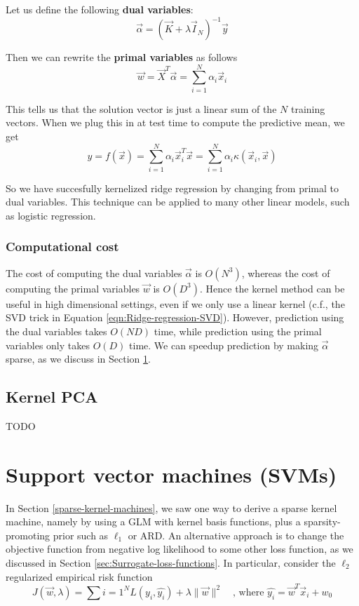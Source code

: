 Let us define the following \textbf{dual variables}:
\begin{equation}
\vec{\alpha}=(\vec{K}+\lambda\vec{I}_N)^{-1}\vec{y}
\end{equation}

Then we can rewrite the \textbf{primal variables} as follows
\begin{equation}
\vec{w}=\vec{X}^T\vec{\alpha}=\sum\limits_{i=1}^N \alpha_i\vec{x}_i
\end{equation}

This tells us that the solution vector is just a linear sum of the $N$ training vectors. When we plug this in at test time to compute the predictive mean, we get
\begin{equation}
y=f(\vec{x})=\sum\limits_{i=1}^N \alpha_i\vec{x}_i^T\vec{x}=\sum\limits_{i=1}^N \alpha_i\kappa(\vec{x}_i,\vec{x})
\end{equation}

So we have succesfully kernelized ridge regression by changing from primal to dual variables. This technique can be applied to many other linear models, such as logistic regression.


\subsubsection{Computational cost}
The cost of computing the dual variables $\vec{\alpha}$ is $O(N^3)$, whereas the cost of computing the primal variables $\vec{w}$ is $O(D^3)$. Hence the kernel method can be useful in high dimensional settings, even if we only use a linear kernel (c.f., the SVD trick in Equation \eqref{eqn:Ridge-regression-SVD}). However, prediction using the dual variables takes $O(ND)$ time, while prediction using the primal variables only takes $O(D)$ time. We can speedup prediction by making $\vec{\alpha}$ sparse, as we discuss in Section \ref{sec:SVMs}.


\subsection{Kernel PCA}
TODO


\section{Support vector machines (SVMs)}
\label{sec:SVMs}
In Section \ref{sparse-kernel-machines}, we saw one way to derive a sparse kernel machine, namely by using a GLM with kernel basis functions, plus a sparsity-promoting prior such as $\ell_1$ or ARD. An alternative approach is to change the objective function from negative log likelihood to some other loss function, as we discussed in Section \ref{sec:Surrogate-loss-functions}. In particular, consider the $\ell_2$ regularized empirical risk function
\begin{equation}
J(\vec{w}, \lambda)=\sum\limits{i=1}^N L(y_i, \hat{y_i})+\lambda\lVert\vec{w}\rVert^2 \quad \text{, where } \hat{y_i}=\vec{w}^T\vec{x}_i+w_0
\end{equation}

